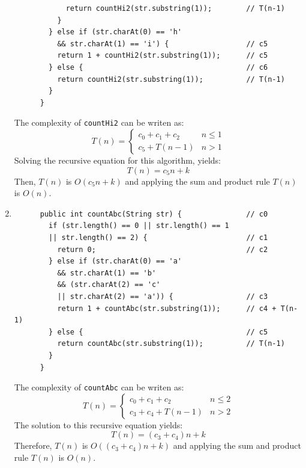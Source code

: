 \documentclass[a4paper,12pt]{article}
\begin{document}
\begin{enumerate}
\begin{Verbatim}
            return countHi2(str.substring(1));        // T(n-1)
          }
        } else if (str.charAt(0) == 'h'
          && str.charAt(1) == 'i') {                  // c5
          return 1 + countHi2(str.substring(1));      // c5
        } else {                                      // c6
          return countHi2(str.substring(1));          // T(n-1)
        }
      }
      \end{Verbatim}
      The complexity of \texttt{countHi2} can be writen as:
      \begin{equation*}
        T\left( n \right)=\left\{\begin{array}{cc} c_{0}+c_{1}+c_{2} & n\leq 1 \\ c_5+T\left( n-1 \right) & n>1\end{array}\right.
      \end{equation*}
      Solving the recursive equation for this algorithm, yields:
      \begin{equation*}
        T\left( n \right)=c_5n+k
      \end{equation*}
      Then, $T(n)$ is $O(c_5n+k)$ and applying the sum and product rule $T(n)$ is $O(n)$.
      \item \begin{Verbatim}
      public int countAbc(String str) {               // c0
        if (str.length() == 0 || str.length() == 1
        || str.length() == 2) {                       // c1
          return 0;                                   // c2
        } else if (str.charAt(0) == 'a'
          && str.charAt(1) == 'b'
          && (str.charAt(2) == 'c'
          || str.charAt(2) == 'a')) {                 // c3
          return 1 + countAbc(str.substring(1));      // c4 + T(n-1)
        } else {                                      // c5
          return countAbc(str.substring(1));          // T(n-1)
        }
      }
      \end{Verbatim}
      The complexity of \texttt{countAbc} can be writen as:
      \begin{equation*}
        T\left( n \right)=\left\{\begin{array}{cc} c_{0}+c_{1}+c_{2} & n\leq 2 \\ c_3 + c_ 4 + T\left( n-1 \right) & n>2\end{array}\right.
      \end{equation*}
      The solution to this recursive equation yields:
      \begin{equation*}
        T(n)=(c_3+c_4)n+k
      \end{equation*}
      Therefore, $T(n)$ is $O((c_3+c_4)n+k)$ and applying the sum and product rule $T(n)$ is $O(n)$.


\end{enumerate}
\end{document}
